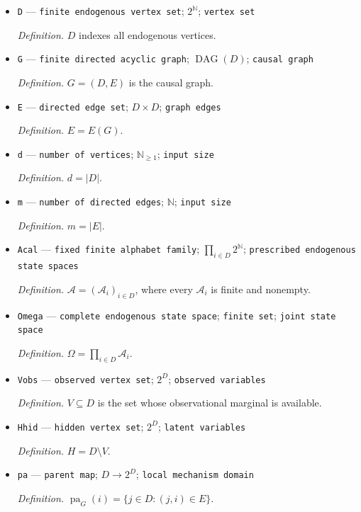 \documentclass{article}
\begin{document}
\begin{itemize}
  \item \texttt{D} --- \texttt{finite endogenous vertex set}; \(2^{\mathbb N}\); \texttt{vertex set}
  \par\smallskip\noindent\emph{Definition.} \(D\) indexes all endogenous vertices.
  \item \texttt{G} --- \texttt{finite directed acyclic graph}; \(\operatorname{DAG}(D)\); \texttt{causal graph}
  \par\smallskip\noindent\emph{Definition.} \(G=(D,E)\) is the causal graph.
  \item \texttt{E} --- \texttt{directed edge set}; \(D\times D\); \texttt{graph edges}
  \par\smallskip\noindent\emph{Definition.} \(E=E(G)\).
  \item \texttt{d} --- \texttt{number of vertices}; \(\mathbb N_{\ge 1}\); \texttt{input size}
  \par\smallskip\noindent\emph{Definition.} \(d=|D|\).
  \item \texttt{m} --- \texttt{number of directed edges}; \(\mathbb N\); \texttt{input size}
  \par\smallskip\noindent\emph{Definition.} \(m=|E|\).
  \item \texttt{Acal} --- \texttt{fixed finite alphabet family}; \(\prod_{i\in D}2^{\mathbb N}\); \texttt{prescribed endogenous state spaces}
  \par\smallskip\noindent\emph{Definition.} \(\mathcal A=(\mathcal A_i)_{i\in D}\), where every \(\mathcal A_i\) is finite and nonempty.
  \item \texttt{Omega} --- \texttt{complete endogenous state space}; \texttt{finite set}; \texttt{joint state space}
  \par\smallskip\noindent\emph{Definition.} \(\Omega=\prod_{i\in D}\mathcal A_i\).
  \item \texttt{Vobs} --- \texttt{observed vertex set}; \(2^D\); \texttt{observed variables}
  \par\smallskip\noindent\emph{Definition.} \(V\subseteq D\) is the set whose observational marginal is available.
  \item \texttt{Hhid} --- \texttt{hidden vertex set}; \(2^D\); \texttt{latent variables}
  \par\smallskip\noindent\emph{Definition.} \(H=D\setminus V\).
  \item \texttt{pa} --- \texttt{parent map}; \(D\to 2^D\); \texttt{local mechanism domain}
  \par\smallskip\noindent\emph{Definition.} \(\operatorname{pa}_G(i)=\{j\in D:(j,i)\in E\}\).

\end{itemize}
\end{document}
